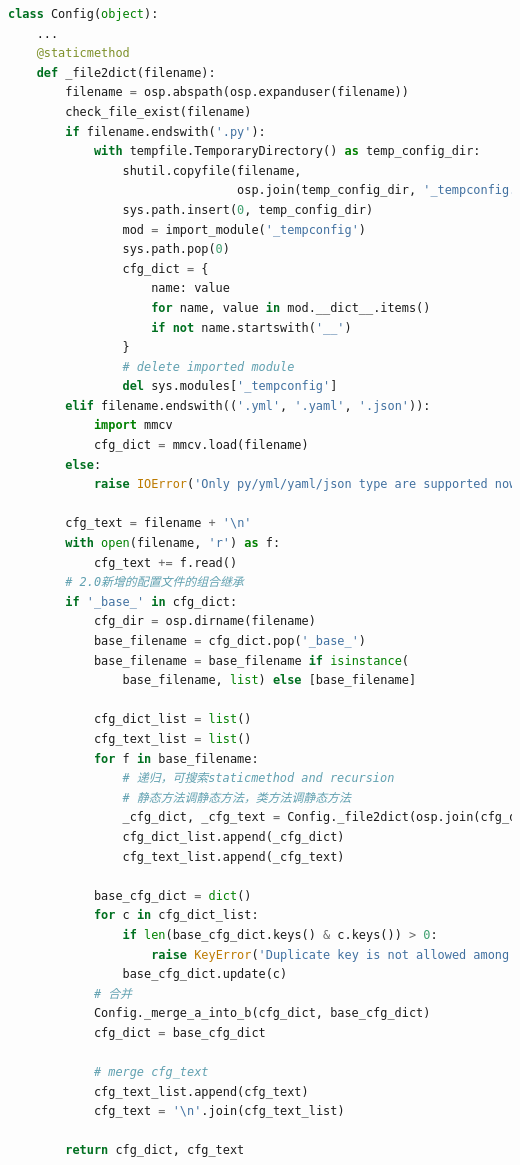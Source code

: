\documentclass[UTF8]{ctexart}
\begin{document}
\lstset{style=mystyle}
\begin{lstlisting}[language=Python]
class Config(object):
    ...
    @staticmethod
    def _file2dict(filename):
        filename = osp.abspath(osp.expanduser(filename))
        check_file_exist(filename)
        if filename.endswith('.py'):
            with tempfile.TemporaryDirectory() as temp_config_dir:
                shutil.copyfile(filename,
                                osp.join(temp_config_dir, '_tempconfig.py'))
                sys.path.insert(0, temp_config_dir)
                mod = import_module('_tempconfig')
                sys.path.pop(0)
                cfg_dict = {
                    name: value
                    for name, value in mod.__dict__.items()
                    if not name.startswith('__')
                }
                # delete imported module
                del sys.modules['_tempconfig']
        elif filename.endswith(('.yml', '.yaml', '.json')):
            import mmcv
            cfg_dict = mmcv.load(filename)
        else:
            raise IOError('Only py/yml/yaml/json type are supported now!')

        cfg_text = filename + '\n'
        with open(filename, 'r') as f:
            cfg_text += f.read()
        # 2.0新增的配置文件的组合继承
        if '_base_' in cfg_dict:
            cfg_dir = osp.dirname(filename)
            base_filename = cfg_dict.pop('_base_')
            base_filename = base_filename if isinstance(
                base_filename, list) else [base_filename]

            cfg_dict_list = list()
            cfg_text_list = list()
            for f in base_filename:
                # 递归，可搜索staticmethod and recursion
                # 静态方法调静态方法，类方法调静态方法
                _cfg_dict, _cfg_text = Config._file2dict(osp.join(cfg_dir, f))
                cfg_dict_list.append(_cfg_dict)
                cfg_text_list.append(_cfg_text)

            base_cfg_dict = dict()
            for c in cfg_dict_list:
                if len(base_cfg_dict.keys() & c.keys()) > 0:
                    raise KeyError('Duplicate key is not allowed among bases')
                base_cfg_dict.update(c)
            # 合并
            Config._merge_a_into_b(cfg_dict, base_cfg_dict)
            cfg_dict = base_cfg_dict

            # merge cfg_text
            cfg_text_list.append(cfg_text)
            cfg_text = '\n'.join(cfg_text_list)

        return cfg_dict, cfg_text
    

\end{lstlisting}
\end{document}

